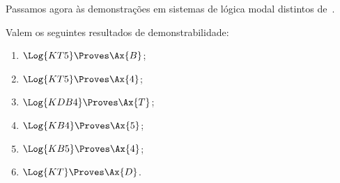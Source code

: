 \documentclass[../../../include/open-logic-section]{subfiles}
\begin{document}


Passamos agora às demonstrações em sistemas de lógica modal distintos
de~.

\begin{prop}
Valem os seguintes resultados de demonstrabilidade:
  \begin{enumerate}
  \item $\Log{KT5} \Proves \Ax{B}$;
  \item $\Log{KT5} \Proves \Ax{4}$;
  \item $\Log{KDB4} \Proves \Ax{T}$;
  \item $\Log{KB4} \Proves \Ax{5}$;
  \item $\Log{KB5} \Proves \Ax{4}$;
  \item {}$\Log{KT} \Proves \Ax{D}$.
  \end{enumerate}
\end{prop}
\end{document}
